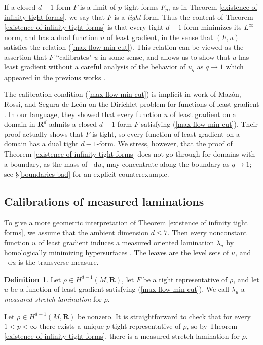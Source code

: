 \documentclass[reqno,11pt]{amsart}
\newcommand{\RR}{\mathbf{R}}
\newcommand*\dif{\mathop{}\!\mathrm{d}}
\newcommand{\dfn}[1]{\emph{#1}\index{#1}}
\theoremstyle{definition}
\newtheorem{definition}[theorem]{Definition}
\numberwithin{equation}{section}
\begin{document}
If a closed $d - 1$-form $F$ is a limit of $p$-tight forms $F_p$, as in Theorem \ref{existence of infinity tight forms}, we say that $F$ is a \dfn{tight} form.
Thus the content of Theorem \ref{existence of infinity tight forms} is that every tight $d - 1$-form minimizes its $L^\infty$ norm, and has a dual function $u$ of least gradient, in the sense that $(F, u)$ satisfies the relation (\ref{max flow min cut}).
This relation can be viewed as the assertion that $F$ ``calibrates" $u$ in some sense, and allows us to show that $u$ has least gradient without a careful analysis of the behavior of $u_q$ as $q \to 1$ which appeared in the previous works \cite{daskalopoulos2020transverse,daskalopoulos2022,Mazon14}.

The calibration condition (\ref{max flow min cut}) is implicit in work of Maz\'on, Rossi, and Segura de Le\'on on the Dirichlet problem for functions of least gradient \cite{Mazon14}.
In our language, they showed that every function $u$ of least gradient on a domain in $\RR^d$ admits a closed $d - 1$-form $F$ satisfying (\ref{max flow min cut}).
Their proof actually shows that $F$ is tight, so every function of least gradient on a domain has a dual tight $d - 1$-form.
We stress, however, that the proof of Theorem \ref{existence of infinity tight forms} does not go through for domains with a boundary, as the mass of $\dif u_q$ may concentrate along the boundary as $q \to 1$; see \S\ref{boundaries bad} for an explicit counterexample.

\subsection{Calibrations of measured laminations}
To give a more geometric interpretation of Theorem \ref{existence of infinity tight forms}, we assume that the ambient dimension $d \leq 7$.
Then every nonconstant function $u$ of least gradient induces a measured oriented lamination $\lambda_u$ by homologically minimizing hypersurfaces \cite{BackusCML}.
The leaves are the level sets of $u$, and $\dif u$ is the transverse measure.

\begin{definition}
Let $\rho \in H^{d - 1}(M, \RR)$, let $F$ be a tight representative of $\rho$, and let $u$ be a function of least gradient satisfying (\ref{max flow min cut}).
We call $\lambda_u$ a \dfn{measured stretch lamination} for $\rho$.
\end{definition}

Let $\rho \in H^{d - 1}(M, \RR)$ be nonzero.
It is straightforward to check that for every $1 < p < \infty$ there exists a unique $p$-tight representative of $\rho$, so by Theorem \ref{existence of infinity tight forms}, there is a measured stretch lamination for $\rho$.
\end{document}
